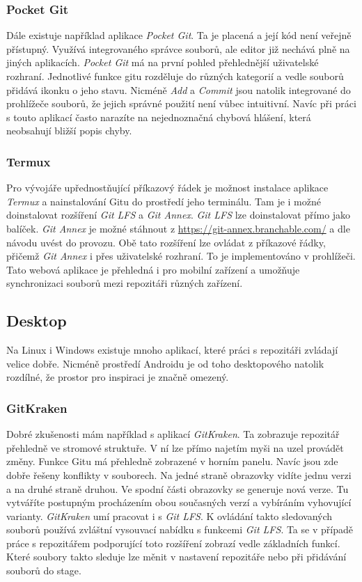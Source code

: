     \subsubsection{Pocket Git}
    Dále existuje například aplikace \emph{Pocket Git}. Ta je placená a její kód není veřejně přístupný. Využívá integrovaného správce souborů, ale editor již nechává plně na jiných aplikacích. \emph{Pocket Git} má na první pohled přehlednější uživatelské rozhraní. Jednotlivé funkce gitu rozděluje do různých kategorií a vedle souborů přidává ikonku o jeho stavu. Nicméně \emph{Add} a \emph{Commit} jsou natolik integrované do prohlížeče souborů, že jejich správné použití není vůbec intuitivní. Navíc při práci s touto aplikací často narazíte na nejednoznačná chybová hlášení, která neobsahují bližší popis chyby.

    \subsubsection{Termux}
    Pro vývojáře upřednostňující příkazový řádek je možnost instalace aplikace \emph{Termux} a nainstalování Gitu do prostředí jeho terminálu. Tam je i možné doinstalovat rozšíření \emph{Git LFS} a \emph{Git Annex}. \emph{Git LFS} lze doinstalovat přímo jako balíček. \emph{Git Annex} je možné stáhnout z \url{https://git-annex.branchable.com/} a dle návodu uvést do provozu. Obě tato rozšíření lze ovládat z příkazové řádky, přičemž \emph{Git Annex} i přes uživatelské rozhraní. To je implementováno v prohlížeči. Tato webová aplikace je přehledná i pro mobilní zařízení a umožňuje synchronizaci souborů mezi repozitáři různých zařízení.

    \subsection {Desktop}
    Na Linux i Windows existuje mnoho aplikací, které práci s repozitáři zvládají velice dobře. Nicméně prostředí Androidu je od toho desktopového natolik rozdílné, že prostor pro inspiraci je značně omezený.
        \subsubsection{GitKraken}
        Dobré zkušenosti mám například s aplikací \emph{GitKraken}. Ta zobrazuje repozitář přehledně ve stromové struktuře. V ní lze přímo najetím myši na uzel provádět změny. Funkce Gitu má přehledně zobrazené v horním panelu. Navíc jsou zde dobře řešeny konflikty v souborech. Na jedné straně obrazovky vidíte jednu verzi a na druhé straně druhou. Ve spodní části obrazovky se generuje nová verze. Tu vytváříte postupným procházením obou současných verzí a vybíráním vyhovující varianty. \emph{GitKraken} umí pracovat i s \emph{Git LFS}. K ovládání takto sledovaných souborů používá zvláštní vysouvací nabídku s funkcemi \emph{Git LFS}. Ta se v případě práce s repozitářem podporující toto rozšíření zobrazí vedle základních funkcí. Které soubory takto sleduje lze měnit v nastavení repozitáře nebo při přidávání souborů do stage.

